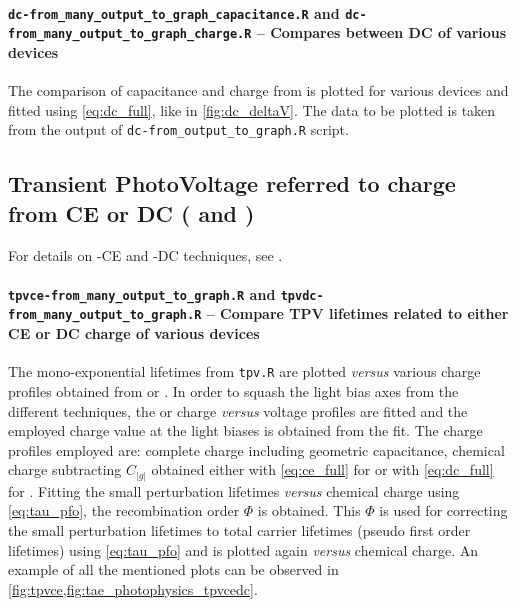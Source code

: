 %		
%		
		\paragraph{\texttt{dc-from\_many\_output\_to\_graph\_capacitance.R} and \texttt{dc-\-from\_many\_output\_to\_graph\_charge.R} -- Compares between DC of various devices}
		The comparison of capacitance and charge from  is plotted for various devices and fitted using \cref{eq:dc_full}, like in \cref{fig:dc_deltaV}.
		The data to be plotted is taken from the output of \texttt{dc-\-from\_output\_to\_graph.R} script.

	\subsection{Transient PhotoVoltage referred to charge from CE or DC ( and )}\label{r_tpvcedc}
		For details on -CE and -DC techniques, see .
%
%
%
		
				\paragraph{\texttt{tpvce-\-from\_many\_output\_to\_graph.R} and \texttt{tpvdc-\-from\_many\_output\_to\_graph.R} -- Compare TPV lifetimes related to either CE or DC charge of various devices}
The mono\hyp{}exponential lifetimes from \texttt{tpv.R} are plotted \textsl{versus} various charge profiles obtained from  or .
In order to squash the light bias axes from the different techniques, the  or  charge \textsl{versus} voltage profiles are fitted and the employed charge value at the  light biases is obtained from the fit.
The charge profiles employed are: complete charge including geometric capacitance, chemical charge subtracting $C_|g|$ obtained either with \cref{eq:ce_full} for  or with \cref{eq:dc_full} for .
Fitting the small perturbation lifetimes \textsl{versus} chemical charge using \cref{eq:tau_pfo}, the recombination order $\Phi$ is obtained.
This $\Phi$ is used for correcting the small perturbation lifetimes to total carrier lifetimes (pseudo first order lifetimes) using \cref{eq:tau_pfo} and is plotted again \textsl{versus} chemical charge.
An example of all the mentioned plots can be observed in \cref{fig:tpvce,fig:tae_photophysics_tpvcedc}.

